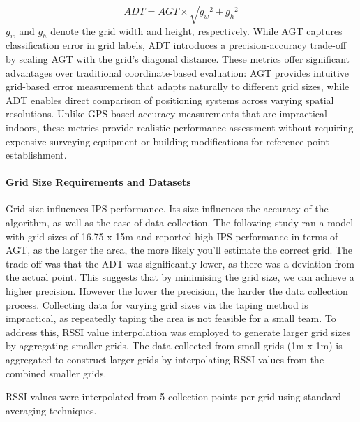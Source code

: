 \documentclass[runningheads]{llncs}
\begin{document}
\begin{equation}
	ADT = AGT \times \sqrt{{g_w}^2 + {g_h}^2}
	\label{eq:adt}
\end{equation}
$g_w$ and $g_h$ denote the grid width and height, respectively. While AGT captures classification error in grid labels, ADT introduces a precision-accuracy trade-off by scaling AGT with the grid's diagonal distance. These metrics offer significant advantages over traditional coordinate-based evaluation: AGT provides intuitive grid-based error measurement that adapts naturally to different grid sizes, while ADT enables direct comparison of positioning systems across varying spatial resolutions. Unlike GPS-based accuracy measurements that are impractical indoors, these metrics provide realistic performance assessment without requiring expensive surveying equipment or building modifications for reference point establishment.

\paragraph{Grid Size Requirements and Datasets} Grid size influences IPS performance. Its size influences the accuracy of the algorithm, as well as the ease of data collection. The following study \cite{LRE1} ran a model with grid sizes of 16.75 x 15m and reported high IPS performance in terms of AGT, as the larger the area, the more likely you’ll estimate the correct grid. The trade off was that the ADT was significantly lower, as there was a deviation from the actual point. This suggests that by minimising the grid size, we can achieve a higher precision. However the lower the precision, the harder the data collection process. 
Collecting data for varying grid sizes via the taping method is impractical, as repeatedly taping the area is not feasible for a small team. To address this, RSSI value interpolation was employed to generate larger grid sizes by aggregating smaller grids. The data collected from small grids (1m x 1m) is aggregated to construct larger grids by interpolating RSSI values from the combined smaller grids.

RSSI values were interpolated from 5 collection points per grid using standard averaging techniques.
\end{document}
